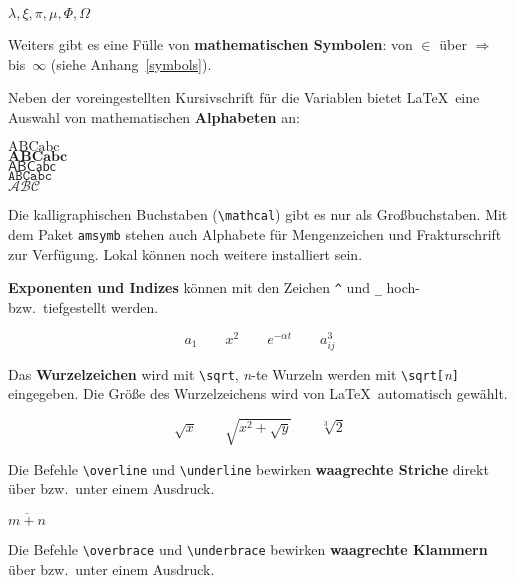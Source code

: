 \begin{LTXexample}
$\lambda, \xi, \pi, \mu,
 \Phi, \Omega $
\end{LTXexample}

 
Weiters gibt es eine Fülle von \textbf{mathematischen Symbolen}:
von $\in$ über $\Rightarrow$ bis~$\infty$ (siehe
Anhang~\vref{symbols}).
 
\bigskip

Neben der voreingestellten Kursivschrift für die Variablen
bietet \LaTeX\ eine Auswahl von mathematischen \textbf{Alphabeten} an:
\begin{LTXexample}
$\mathrm{ABCabc}$ \\
$\mathbf{ABCabc}$ \\
$\mathsf{ABCabc}$ \\
$\mathtt{ABCabc}$ \\
$\mathcal{ABC}$
\end{LTXexample}

Die kalligraphischen Buchstaben (\lstinline:\mathcal:) gibt es nur als
Großbuchstaben. Mit dem Paket \texttt{amsymb} \cite{ch8} stehen
auch Alphabete für Mengenzeichen und Frakturschrift zur Verfügung.
Lokal können noch weitere installiert sein.


\bigskip

\textbf{Exponenten und Indizes} können mit den Zeichen \lstinline|^|
und \lstinline|_| hoch- bzw.\ tiefgestellt werden.

\begin{LTXexample}
\[
a_{1} \qquad x^{2} \qquad
 e^{-\alpha t} \qquad a^{3}_{ij}
\]
\end{LTXexample}

 
Das \textbf{Wurzelzeichen} wird mit \lstinline|\sqrt|, \textit{n}-te
Wurzeln werden mit \lstinline|\sqrt[|\textit{n}\lstinline|]| eingegeben.
Die Größe des Wurzelzeichens wird von \LaTeX\ automatisch
gewählt.

\begin{LTXexample}
\[
\sqrt{x} \qquad  \sqrt{ x^{2}+\sqrt{y} }
   \qquad \sqrt[3]{2}
\]
\end{LTXexample}
 
Die Befehle \lstinline|\overline| und \lstinline|\underline| bewirken
\textbf{waagrechte Striche} direkt über bzw.\ unter einem
Ausdruck.
\begin{LTXexample}
$\overline{m+n}$
\end{LTXexample}
 
Die Befehle \lstinline|\overbrace| und \lstinline|\underbrace| bewirken
\textbf{waagrechte Klammern} über bzw.\ unter einem Ausdruck.

